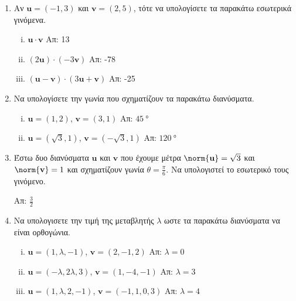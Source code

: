 \documentclass[a4paper,table]{report}
\begin{document}
\begin{enumerate}
    \item Αν $ \mathbf{u} = (-1,3) $ και $ \mathbf{v} = (2,5) $, τότε να υπολογίσετε τα παρακάτω
        εσωτερικά γινόμενα.
        \begin{enumerate}[i)]
            \item $ \mathbf{u} \cdot \mathbf{v} $ \hfill Απ: 13 
            \item $ (2 \mathbf{u}) \cdot (-3 \mathbf{v}) $ \hfill Απ: -78 
            \item $ (\mathbf{u} - \mathbf{v}) \cdot (3 \mathbf{u}+ \mathbf{v}) $ \hfill Απ: -25 
        \end{enumerate}

    \item Να υπολογίσετε την γωνία που σχηματίζουν τα παρακάτω διανύσματα.
        \begin{enumerate}[i)]
            \item $ \mathbf{u} = \left(1,2\right) $, $ \mathbf{v} = \left(3,1\right) $ \hfill Απ: $
                        \SI{45}{\degree} $ 
            \item $ \mathbf{u} = \left(\sqrt{3}, 1\right) $, $ \mathbf{v} = \left(- \sqrt{3} , 
                1\right) $ \hfill Απ: $ \SI{120}{\degree}$ 
        \end{enumerate}

    \item Έστω δυο διανύσματα $ \mathbf{u} $ και $ \mathbf{v} $ που έχουμε μέτρα $ \norm{\mathbf{u}}
        = \sqrt{3} $ και $ \norm{\mathbf{v}} = 1 $ και σχηματίζουν γωνία $ \theta =
        \frac{\pi}{6} $. Να υπολογιστεί το εσωτερικό τους γινόμενο. 

        \hfill Απ: $ \frac{3}{2} $ 

    \item Να υπολογισετε την τιμή της μεταβλητής $ \lambda $ ωστε τα παρακάτω διανύσματα να είναι 
        ορθογώνια.
        \begin{enumerate}[i)]
            \item $ \mathbf{u} = (1, \lambda, -1) $, $ \mathbf{v} = (2,-1,2) $ \hfill 
                Απ: $ \lambda = 0 $
            \item $ \mathbf{u} = (- \lambda, 2 \lambda, 3) $, $ \mathbf{v} = (1,-4,-1) $ \hfill Απ:
                $ \lambda = 3 $ 
            \item $ \mathbf{u} = (1, \lambda, 2,-1) $, $ \mathbf{v} = (-1,1,0,3) $ \hfill Απ: $
                \lambda = 4 $ 
        \end{enumerate}
\end{enumerate}
\end{document}
